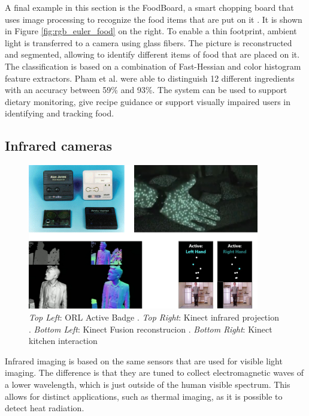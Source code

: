 A final example in this section is the FoodBoard, a smart chopping board that uses image processing to recognize the food items that are put on it \cite{pham2013foodboard}. It is shown in Figure \ref{fig:rgb_euler_food} on the right. To enable a thin footprint, ambient light is transferred to a camera using glass fibers. The picture is reconstructed and segmented, allowing to identify different items of food that are placed on it. The classification is based on a combination of Fast-Hessian and color histogram feature extractors. Pham et al. were able to distinguish 12 different ingredients with an accuracy between 59\% and 93\%. The system can be used to support dietary monitoring, give recipe guidance or support visually impaired users in identifying and tracking food.
\subsection{Infrared cameras}
\begin{figure}[h]
\centering
\includegraphics[width=0.9\textwidth]{images/rel_tech_infra}
\caption{\emph{Top Left}: ORL Active Badge  \cite{Weiser1991}. \emph{Top Right}: Kinect infrared projection \cite{zhang2012microsoft}. \emph{Bottom Left}: Kinect Fusion reconstrucion  \cite{Izadi2011}. \emph{Bottom Right}: Kinect kitchen interaction \cite{panger2012kinect}}
\label{fig:rel_tech_infra}
\end{figure}
Infrared imaging is based on the same sensors that are used for visible light imaging. The difference is that they are tuned to collect electromagnetic waves of a lower wavelength, which is just outside of the human visible spectrum. This allows for distinct applications, such as thermal imaging, as it is possible to detect heat radiation. 

